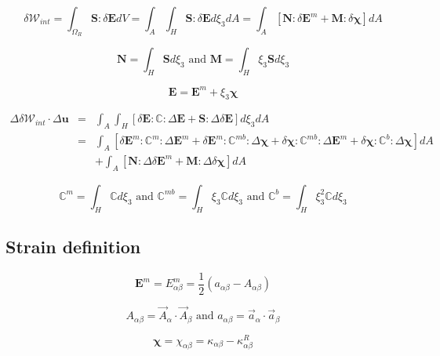 \documentclass[12pt]{article}
\begin{document}
\begin{equation}
\delta\mathcal{W}_{int} = \int_{\Omega_R}\pmb{S}:\delta\pmb{E} dV
 = \int_A\int_H \pmb{S}:\delta\pmb{E} d\xi_3dA
 = \int_A \left[\pmb{N}:\delta\pmb{E}^m + \pmb{M}:\delta\pmb{\chi}\right] dA
\end{equation}

\begin{equation}
\pmb{N} = \int_H \pmb{S} d\xi_3 \mbox{ and }
\pmb{M} = \int_H \xi_3\pmb{S} d\xi_3
\end{equation}

\begin{equation}
\pmb{E} = \pmb{E}^m + \xi_3\pmb{\chi}
\end{equation}

\begin{eqnarray}
\Delta\delta\mathcal{W}_{int}\cdot\Delta\pmb{u}
 & = & \int_A\int_H \left[\delta\pmb{E}:\mathbb{C}:\Delta\pmb{E}
      + \pmb{S}:\Delta\delta\pmb{E}\right] d\xi_3dA \nonumber \\
 & = & \int_A \left[\delta\pmb{E}^m:\mathbb{C}^m:\Delta\pmb{E}^m
      + \delta\pmb{E}^m:\mathbb{C}^{mb}:\Delta\pmb{\chi}
      + \delta\pmb{\chi}:\mathbb{C}^{mb}:\Delta\pmb{E}^m
      + \delta\pmb{\chi}:\mathbb{C}^b:\Delta\pmb{\chi}\right] dA \nonumber \\
 &   & + \int_A \left[\pmb{N}:\Delta\delta\pmb{E}^m
      + \pmb{M}:\Delta\delta\pmb{\chi}\right] dA
\end{eqnarray}

\begin{equation}
\mathbb{C}^m = \int_H \mathbb{C} d\xi_3 \mbox{ and }
\mathbb{C}^{mb} = \int_H \xi_3 \mathbb{C} d\xi_3 \mbox{ and }
\mathbb{C}^b = \int_H \xi^2_3 \mathbb{C} d\xi_3
\end{equation}

%
\subsection{Strain definition}
%
\begin{equation}
\pmb{E}^m = E^m_{\alpha\beta}
 = \frac{1}{2}(a_{\alpha\beta} - A_{\alpha\beta})
\end{equation}

\begin{equation}
A_{\alpha\beta} = \vec{A}_{\alpha}\cdot\vec{A}_{\beta} \mbox{ and }
a_{\alpha\beta} = \vec{a}_{\alpha}\cdot\vec{a}_{\beta}
\end{equation}

\begin{equation}
\pmb{\chi} = \chi_{\alpha\beta} = \kappa_{\alpha\beta} - \kappa^R_{\alpha\beta}
\end{equation}
\end{document}
